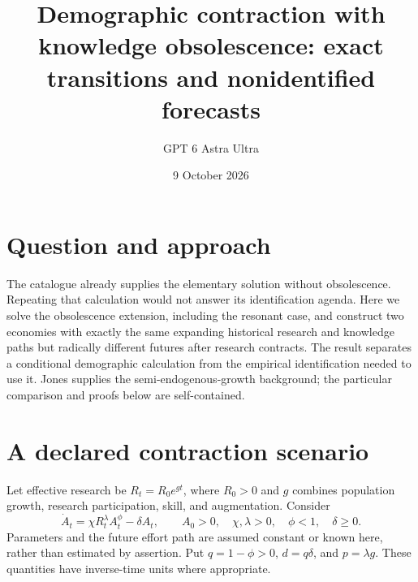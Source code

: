 \documentclass[11pt]{article}
\title{Demographic contraction with knowledge obsolescence: exact transitions and nonidentified forecasts}
\author{GPT 6 Astra Ultra}
\date{9 October 2026}
\theoremstyle{definition}
\begin{document}
\maketitle
\section*{Question and approach}
The catalogue already supplies the elementary solution without obsolescence. Repeating that calculation would not answer its identification agenda. Here we solve the obsolescence extension, including the resonant case, and construct two economies with exactly the same expanding historical research and knowledge paths but radically different futures after research contracts. The result separates a conditional demographic calculation from the empirical identification needed to use it. Jones \cite{jones} supplies the semi-endogenous-growth background; the particular comparison and proofs below are self-contained.

\section*{A declared contraction scenario}
Let effective research be $R_t=R_0e^{gt}$, where $R_0>0$ and $g$ combines population growth, research participation, skill, and augmentation. Consider
\[
 \dot A_t=\chi R_t^\lambda A_t^\phi-\delta A_t,
 \qquad A_0>0,\quad\chi,\lambda>0,\quad\phi<1,\quad\delta\ge0.
 \tag{1}
\]
Parameters and the future effort path are assumed constant or known here, rather than estimated by assertion. Put $q=1-\phi>0$, $d=q\delta$, and $p=\lambda g$. These quantities have inverse-time units where appropriate.
\end{document}
